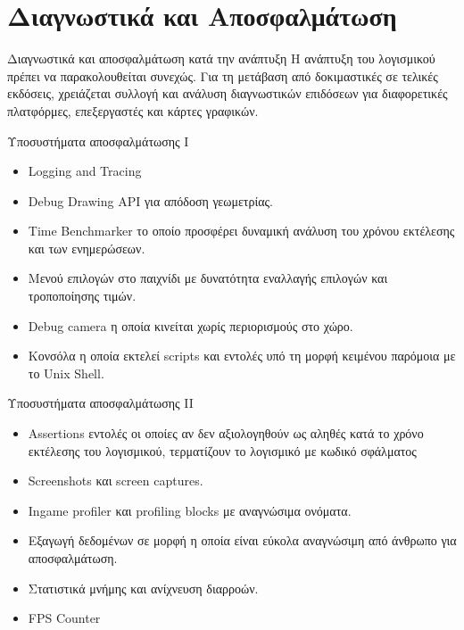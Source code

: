 \documentclass{beamer}
\begin{document}
	
	\section{Διαγνωστικά και Αποσφαλμάτωση}
	\begin{frame}{Διαγνωστικά και αποσφαλμάτωση κατά την ανάπτυξη}
		Η ανάπτυξη του λογισμικού πρέπει να παρακολουθείται συνεχώς. 
		\newline 
		\newline 
		Για τη μετάβαση από δοκιμαστικές σε τελικές εκδόσεις, χρειάζεται συλλογή και ανάλυση διαγνωστικών επιδόσεων για διαφορετικές πλατφόρμες, επεξεργαστές και κάρτες γραφικών. 
	\end{frame}
	
	\begin{frame}{Υποσυστήματα αποσφαλμάτωσης Ι}
		\begin{itemize}
			\item Logging and Tracing
			\item Debug Drawing API για απόδοση γεωμετρίας.
			\item Time Benchmarker το οποίο προσφέρει δυναμική ανάλυση του χρόνου εκτέλεσης και των ενημερώσεων.
			\item Μενού επιλογών στο παιχνίδι με δυνατότητα εναλλαγής επιλογών και τροποποίησης τιμών.
			\item Debug camera η οποία κινείται χωρίς περιορισμούς στο χώρο.
			\item Κονσόλα η οποία εκτελεί scripts και εντολές υπό τη μορφή κειμένου παρόμοια με το Unix Shell.	
		\end{itemize}
	\end{frame}			
	
	\begin{frame}{Υποσυστήματα αποσφαλμάτωσης II}
		\begin{itemize}	
			\item Assertions εντολές οι οποίες αν δεν αξιολογηθούν ως αληθές κατά το χρόνο εκτέλεσης του λογισμικού, τερματίζουν το λογισμικό με κωδικό σφάλματος						
			\item Screenshots και screen captures.
			\item Ιngame profiler και profiling blocks με αναγνώσιμα ονόματα.
			\item Εξαγωγή δεδομένων σε μορφή η οποία είναι εύκολα αναγνώσιμη από άνθρωπο για αποσφαλμάτωση.
			\item Στατιστικά μνήμης και ανίχνευση διαρροών.
			\item FPS Counter
		\end{itemize}
	\end{frame}
	
\end{document}
